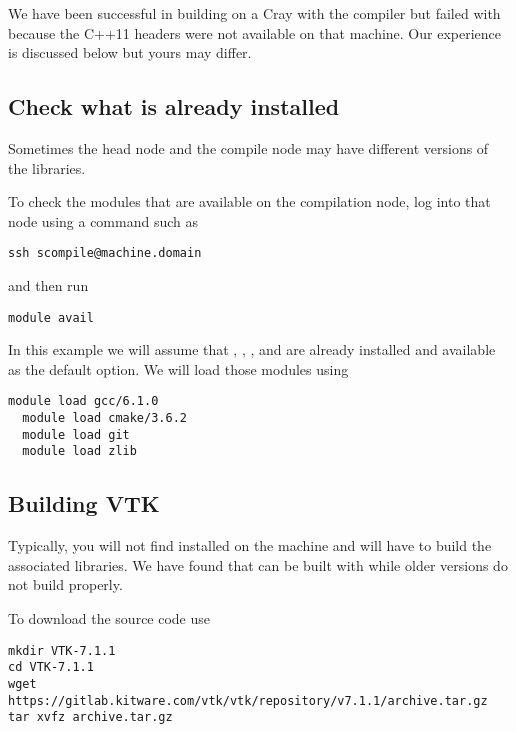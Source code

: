 \documentclass[11pt,fleqn]{book} %
\begin{document}
\begin{WarningBox}
We have been successful in building on a Cray with the  compiler but failed with
 because the C++11 headers were not available on that machine.  Our experience is 
discussed below but yours may differ.
\end{WarningBox}

\subsection{Check what is already installed}

\begin{WarningBox}
Sometimes the head node and the compile node may have different versions of the  libraries.  
\end{WarningBox}

To check the modules that are available on the compilation node, log into that node using a command such as
\begin{lstlisting}[backgroundcolor=\color{background}]
  ssh scompile@machine.domain
\end{lstlisting}
and then run
\begin{lstlisting}[backgroundcolor=\color{background}]
  module avail
\end{lstlisting}

In this example we will assume that , , ,
and  are already installed and available as the
default option.  We will load those modules using
\begin{lstlisting}[backgroundcolor=\color{background}]
  module load gcc/6.1.0
  module load cmake/3.6.2
  module load git
  module load zlib
\end{lstlisting}

\subsection{Building VTK}

Typically, you will not find  installed on the machine and will have to build the
associated libraries.  We have found that  can be built with  while
older versions do not build properly.

To download the  source code use
\begin{lstlisting}[backgroundcolor=\color{background}]
mkdir VTK-7.1.1
cd VTK-7.1.1
wget https://gitlab.kitware.com/vtk/vtk/repository/v7.1.1/archive.tar.gz
tar xvfz archive.tar.gz
\end{lstlisting}
\end{document}
